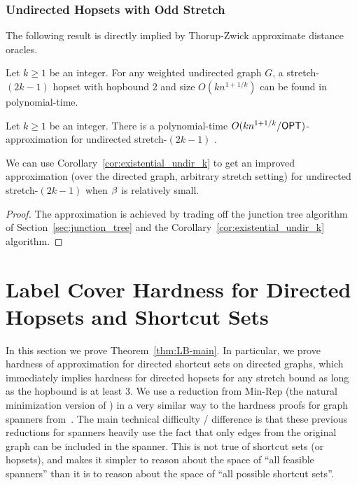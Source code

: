 \subsubsection{Undirected Hopsets with Odd Stretch}

The following result is directly implied by Thorup-Zwick approximate distance oracles.

\begin{lemma}
    Let $k \geq 1$ be an integer. For any weighted undirected graph $G$, a stretch-$(2k-1)$ hopset with hopbound $2$ and size $O(kn^{1+1/k})$ can be found in polynomial-time.
\end{lemma}
\begin{corollary} \label{cor:existential_undir_k}
    Let $k \geq 1$ be an integer. There is a polynomial-time $O(kn^{1+1/k} / {{\sf OPT}})$-approximation for undirected stretch-$(2k-1)$ {\hopset}.
\end{corollary}

We can use Corollary~\ref{cor:existential_undir_k} to get an improved approximation (over the directed graph, arbitrary stretch setting) for undirected stretch-$(2k-1)$ {\hopset} when $\beta$ is relatively small.

\undirGenStretch*
\begin{proof}
    The approximation is achieved by trading off the junction tree algorithm of Section~\ref{sec:junction_tree} and the Corollary~\ref{cor:existential_undir_k} algorithm.
\end{proof}


\section{Label Cover Hardness for Directed Hopsets and Shortcut Sets}\label{app:hardness}
In this section we prove Theorem~\ref{thm:LB-main}. 
 In particular, we prove hardness of approximation for directed shortcut sets on directed graphs, which immediately implies hardness for directed hopsets for any stretch bound as long as the hopbound is at least $3$.  We use a reduction from Min-Rep (the natural minimization version of \LabelCover) in a very similar way to the hardness proofs for graph spanners from~\cite{Kor01,EP07,DKR16,CD16}.  The main technical difficulty / difference is that these previous reductions for spanners heavily use the fact that only edges from the original graph can be included in the spanner.  This is not true of shortcut sets (or hopsets), and makes it simpler to reason about the space of ``all feasible spanners'' than it is to reason about the space of ``all possible shortcut sets''.  

